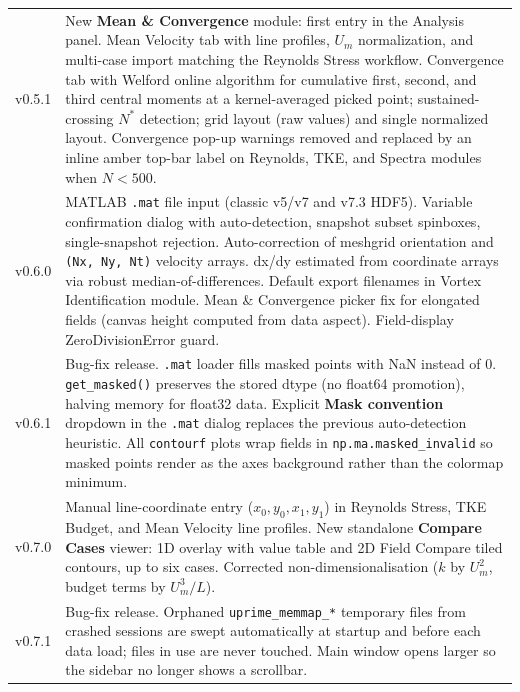 \documentclass[11pt, a4paper]{report}
\newcommand{\uipth}[1]{\textbf{\textcolor{upblue}{#1}}}
\begin{document}
\begin{longtable}{lp{12cm}}
v0.5.1 & New \uipth{Mean \& Convergence} module: first entry in the Analysis panel. Mean Velocity tab with line profiles, $U_m$ normalization, and multi-case import matching the Reynolds Stress workflow. Convergence tab with Welford online algorithm for cumulative first, second, and third central moments at a kernel-averaged picked point; sustained-crossing $N^*$ detection; grid layout (raw values) and single normalized layout. Convergence pop-up warnings removed and replaced by an inline amber top-bar label on Reynolds, TKE, and Spectra modules when $N < 500$. \\
v0.6.0 & MATLAB \texttt{.mat} file input (classic v5/v7 and v7.3 HDF5). Variable confirmation dialog with auto-detection, snapshot subset spinboxes, single-snapshot rejection. Auto-correction of meshgrid orientation and \texttt{(Nx, Ny, Nt)} velocity arrays. dx/dy estimated from coordinate arrays via robust median-of-differences. Default export filenames in Vortex Identification module. Mean \& Convergence picker fix for elongated fields (canvas height computed from data aspect). Field-display ZeroDivisionError guard. \\
v0.6.1 & Bug-fix release. \texttt{.mat} loader fills masked points with NaN instead of 0. \texttt{get\_masked()} preserves the stored dtype (no float64 promotion), halving memory for float32 data. Explicit \uipth{Mask convention} dropdown in the \texttt{.mat} dialog replaces the previous auto-detection heuristic. All \texttt{contourf} plots wrap fields in \texttt{np.ma.masked\_invalid} so masked points render as the axes background rather than the colormap minimum. \\
v0.7.0 & Manual line-coordinate entry ($x_0, y_0, x_1, y_1$) in Reynolds Stress, TKE Budget, and Mean Velocity line profiles. New standalone \uipth{Compare Cases} viewer: 1D overlay with value table and 2D Field Compare tiled contours, up to six cases. Corrected non-dimensionalisation ($k$ by $U_m^2$, budget terms by $U_m^3/L$). \\
v0.7.1 & Bug-fix release. Orphaned \texttt{uprime\_memmap\_*} temporary files from crashed sessions are swept automatically at startup and before each data load; files in use are never touched. Main window opens larger so the sidebar no longer shows a scrollbar. \\
\bottomrule
\end{longtable}
\end{document}
